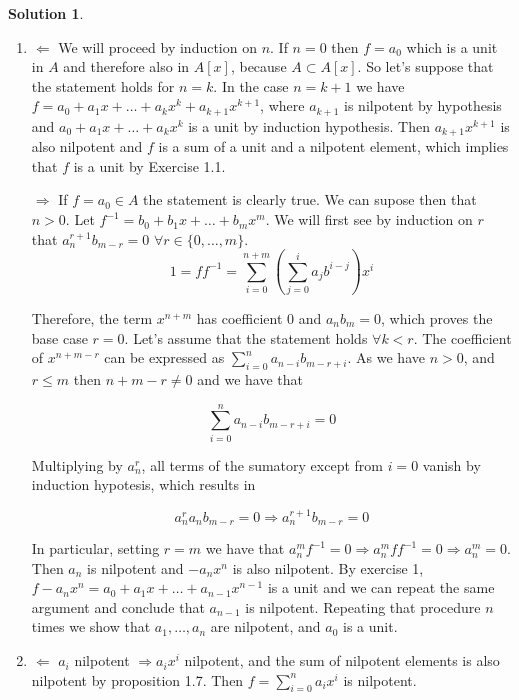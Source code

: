 \documentclass[12pt]{article}
\newcommand{\imp}{\ensuremath{\Rightarrow}}
\theoremstyle{definition}
\newtheorem*{sol}{Solution}
\begin{document}
\begin{sol}
\begin{enumerate}[label=(\roman*)]
	\item $\boxed{\Leftarrow}$ We will proceed by induction on $n$. If $n = 0$ then $f = a_0$ which is a unit in $A$ and therefore also in $A[x]$, because $A \subset A[x]$. So let's suppose that the statement holds for $n = k$. In the case $n = k+1$ we have $f = a_0 + a_1x + \dots + a_k x^k + a_{k+1}x^{k+1}$, where $a_{k+1}$ is nilpotent by hypothesis and $a_0 + a_1x + \dots + a_k x^k$ is a unit by induction hypothesis. Then $a_{k+1} x^{k+1}$ is also nilpotent and $f$ is a sum of a unit and a nilpotent element, which implies that $f$ is a unit by Exercise 1.1. 

	$\boxed{\Rightarrow}$ If $f = a_0 \in A$ the statement is clearly true. We can supose then that $n > 0$. Let $f^{-1} = b_0 + b_1 x + \dots + b_mx^m$. We will first see by induction on $r$ that $a_n^{r+1} b_{m-r} = 0 \, \, \forall r \in \{0, \dots , m \}$. 
	\[
	1 = ff^{-1} = \sum_{i = 0}^{n+m} \left ( \sum_{j = 0}^i a_j b^{i-j} \right ) x^i
	\]

	Therefore, the term $x^{n+m}$ has coefficient 0 and $a_n b_m = 0$, which proves the base case $r = 0$. Let's assume that the statement holds $ \forall k < r$. The coefficient of $x^{n+m-r}$ can be expressed as $\sum_{i = 0}^{n} a_{n-i} b_{m-r+i}$. As we have $n > 0$, and $r \leq m$ then $n+m-r \neq 0$ and we have that

	\[
		\sum_{i = 0}^{n} a_{n-i} b_{m-r+i} = 0
	\]
	
	Multiplying by $a_n^r$, all terms of the sumatory except from $i = 0$ vanish by induction hypotesis, which results in

	\[
		a_n^r a_{n} b_{m-r} = 0 \Rightarrow a_n^{r+1}b_{m-r} = 0
	\]

	In particular, setting $r = m$ we have that $a_n^m f^{-1} = 0 \imp a_n^m ff^{-1} = 0 \imp a_n^m = 0$. Then $a_n$ is nilpotent and $-a_nx^n$ is also nilpotent. By exercise 1, $f-a_n x^n = a_0 + a_1 x + \dots + a_{n-1} x^{n-1}$ is a unit and we can repeat the same argument and conclude that $a_{n-1}$ is nilpotent. Repeating that procedure $n$ times we show that $a_1, \dots, a_n$ are nilpotent, and $a_0$ is a unit.
	


	\item $\boxed{\Leftarrow}$ $a_i$ nilpotent $\imp a_i x^i$ nilpotent, and the sum of nilpotent elements is also nilpotent by proposition 1.7. Then $f = \sum_{i=0}^n a_i x^i$ is nilpotent.


\end{enumerate}
\end{sol}
\end{document}
